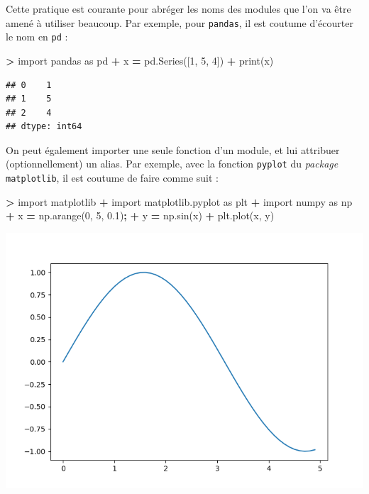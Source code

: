 \documentclass[12pt,]{book}
\newenvironment{Shaded}{\begin{snugshade}}{\end{snugshade}}
\newcommand{\DecValTok}[1]{\textcolor[rgb]{0.00,0.00,0.81}{#1}}
\newcommand{\FloatTok}[1]{\textcolor[rgb]{0.00,0.00,0.81}{#1}}
\newcommand{\ImportTok}[1]{#1}
\newcommand{\OperatorTok}[1]{\textcolor[rgb]{0.81,0.36,0.00}{\textbf{#1}}}
\newcommand{\BuiltInTok}[1]{#1}
\newcommand{\NormalTok}[1]{#1}
\numberwithin{equation}{section}
\numberwithin{countremarque}{section}
\begin{document}
Cette pratique est courante pour abréger les noms des modules que l'on
va être amené à utiliser beaucoup. Par exemple, pour \texttt{pandas}, il
est coutume d'écourter le nom en \texttt{pd} :

\begin{Shaded}
\begin{Highlighting}[]
\OperatorTok{>} \ImportTok{import}\NormalTok{ pandas }\ImportTok{as}\NormalTok{ pd}
\OperatorTok{+}\NormalTok{ x }\OperatorTok{=}\NormalTok{ pd.Series([}\DecValTok{1}\NormalTok{, }\DecValTok{5}\NormalTok{, }\DecValTok{4}\NormalTok{])}
\OperatorTok{+} \BuiltInTok{print}\NormalTok{(x)}
\end{Highlighting}
\end{Shaded}

\begin{lstlisting}
## 0    1
## 1    5
## 2    4
## dtype: int64
\end{lstlisting}

On peut également importer une seule fonction d'un module, et lui
attribuer (optionnellement) un alias. Par exemple, avec la fonction
\texttt{pyplot} du \emph{package} \texttt{matplotlib}, il est coutume de
faire comme suit :

\begin{Shaded}
\begin{Highlighting}[]
\OperatorTok{>} \ImportTok{import}\NormalTok{ matplotlib}
\OperatorTok{+} \ImportTok{import}\NormalTok{ matplotlib.pyplot  }\ImportTok{as}\NormalTok{ plt}
\OperatorTok{+} \ImportTok{import}\NormalTok{ numpy  }\ImportTok{as}\NormalTok{ np}
\OperatorTok{+}\NormalTok{ x }\OperatorTok{=}\NormalTok{ np.arange(}\DecValTok{0}\NormalTok{, }\DecValTok{5}\NormalTok{, }\FloatTok{0.1}\NormalTok{)}\OperatorTok{;}
\OperatorTok{+}\NormalTok{ y }\OperatorTok{=}\NormalTok{ np.sin(x)}
\OperatorTok{+}\NormalTok{ plt.plot(x, y)}
\end{Highlighting}
\end{Shaded}

\begin{center}\includegraphics[width=9.03in]{figs/intro_pyplot} \end{center}
\end{document}
